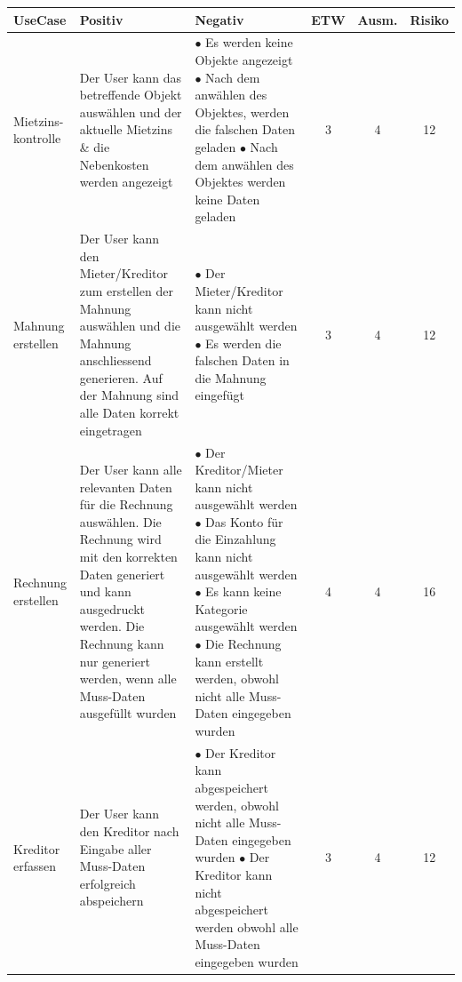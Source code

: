 \begin{table}[H]
  \centering
  \settowidth{}
  \setlength\extrarowheight{2pt}
  \begin{tabulary}{1.0\textwidth}{|L|L|L|C|C|C|}
    \hline
    \textbf{UseCase} & 
    \textbf{Positiv}& 
    \textbf{Negativ} &
    \textbf{ETW} & 
    \textbf{Ausm.} & 
    \textbf{Risiko}\\
    \hline
    Mietzins-kontrolle &  Der User kann das betreffende Objekt auswählen und der aktuelle Mietzins \& die Nebenkosten werden angezeigt & $\bullet$ Es werden keine Objekte angezeigt \newline $\bullet$  Nach dem anwählen des Objektes, werden die falschen Daten geladen \newline $\bullet$ Nach dem anwählen des Objektes werden keine Daten geladen & 3 & 4 &  12\\
    \hline
    Mahnung erstellen &  Der User kann den Mieter/Kreditor zum erstellen der Mahnung auswählen und die Mahnung anschliessend generieren. Auf der Mahnung sind alle Daten korrekt eingetragen & $\bullet$ Der Mieter/Kreditor kann nicht ausgewählt werden \newline $\bullet$ Es werden die falschen Daten in die Mahnung eingefügt & 3 & 4 &  12\\
    \hline
    Rechnung erstellen &  Der User kann alle relevanten Daten für die Rechnung auswählen. Die Rechnung wird mit den korrekten Daten generiert und kann ausgedruckt werden. Die Rechnung kann nur generiert werden, wenn alle Muss-Daten ausgefüllt wurden & $\bullet$ Der Kreditor/Mieter kann nicht ausgewählt werden \newline $\bullet$ Das Konto für die Einzahlung kann nicht ausgewählt werden \newline $\bullet$ Es kann keine Kategorie ausgewählt werden \newline $\bullet$ Die Rechnung kann erstellt werden, obwohl nicht alle Muss-Daten eingegeben wurden & 4 & 4 &  16\\
    \hline
    Kreditor erfassen &  Der User kann den Kreditor nach Eingabe aller Muss-Daten erfolgreich abspeichern & $\bullet$ Der Kreditor kann abgespeichert werden, obwohl nicht alle Muss-Daten eingegeben wurden \newline $\bullet$ Der Kreditor kann nicht abgespeichert werden obwohl alle Muss-Daten eingegeben wurden & 3 & 4 &  12\\

\end{tabulary}
\end{table}
